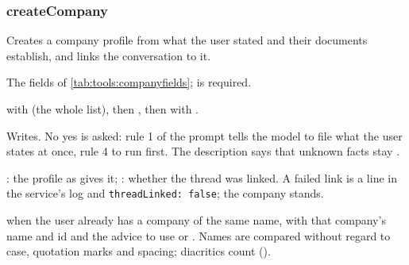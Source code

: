 \subsubsection{createCompany}\label{sec:tools:createCompany}
\begin{description}[style=multiline, leftmargin=19mm, labelwidth=17mm, labelsep=2mm,
  font=\sffamily\bfseries\footnotesize\color{ink}, itemsep=1pt, topsep=2pt, before=\raggedright]
  \item[Does] Creates a company profile from what the user stated and their documents
    establish, and links the conversation to it.
  \item[Input] The fields of \cref{tab:tools:companyfields};  is required.
  \item[Calls]  with  (the whole list), then
    , then  with
    .
  \item[Kind] Writes. No yes is asked: rule 1 of the prompt tells the model to file what the
    user states at once, rule 4 to run  first. The description says that
    unknown facts stay .
  \item[Returns] : the profile as  gives it; :
    whether the thread was linked. A failed link is a line in the service's log and
    \texttt{threadLinked: false}; the company stands.
  \item[Errors]  when the user already has a company of the same name,
    with that company's name and id and the advice to use  or
    . Names are compared without regard to case, quotation marks and
    spacing; diacritics count ().
\end{description}

